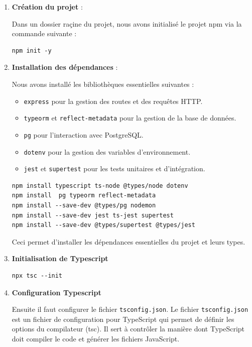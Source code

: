 \begin{enumerate}
    \item \textbf{Création du projet} : 
    
    Dans un dossier raçine du projet, nous avons initialisé le projet npm via la commande suivante : 

    \begin{verbatim}
npm init -y
    \end{verbatim}
    
    \item \textbf{Installation des dépendances} : 
    
    Nous avons installé les bibliothèques essentielles suivantes :
    \begin{itemize}
        \item \texttt{express} pour la gestion des routes et des requêtes HTTP.
        \item \texttt{typeorm} et \texttt{reflect-metadata} pour la gestion de la base de données.
        \item \texttt{pg} pour l’interaction avec PostgreSQL.
        \item \texttt{dotenv} pour la gestion des variables d’environnement.
        \item \texttt{jest} et \texttt{supertest} pour les tests unitaires et d’intégration.
    \end{itemize}

    \begin{verbatim}
npm install typescript ts-node @types/node dotenv
npm install  pg typeorm reflect-metadata 
npm install --save-dev @types/pg nodemon
npm install --save-dev jest ts-jest supertest
npm install --save-dev @types/supertest @types/jest
    \end{verbatim}
   
    Ceci permet d'installer les dépendances essentielles du projet et leurs types.
    \vspace{0.35cm}
    \item \textbf{Initialisation de Typescript}
    \begin{verbatim}
npx tsc --init
    \end{verbatim}

    \item \textbf{Configuration Typescript} 
    
    Ensuite il faut configurer le fichier \verb|tsconfig.json|. Le fichier \verb|tsconfig.json| est un fichier de configuration pour TypeScript qui permet de définir les options du compilateur (tsc). Il sert à contrôler la manière dont TypeScript doit compiler le code et générer les fichiers JavaScript.


\end{enumerate}
